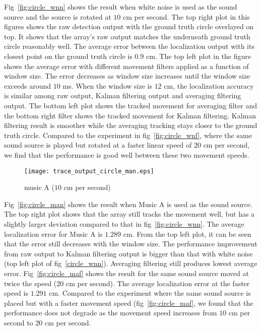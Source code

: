 Fig~\ref{fig:circle_wnn} shows the result when white noise is used as the sound source and the source is rotated at $10$ cm per second. The top right plot in this figures shows the raw detection output with the ground truth circle overlayed on top. It shows that the array's raw output matches the underneath ground truth circle reasonably well. The average error between the localization output with its closest point on the ground truth circle is $0.9$ cm. The top left plot in the figure shows the average error with different movement filters applied as a function of window size. The error decreases as window size increases until the window size exceeds around $10$ ms. When the window size is $12$ cm, the localization accuracy is similar among raw output, Kalman filtering output and averaging filtering output. The bottom left plot shows the tracked movement for averaging filter and the bottom right filter shows the tracked movement for Kalman filtering. Kalman filtering result is smoother while the averaging tracking stays closer to the ground truth circle. Compared to the experiment in fig~\ref{fig:circle_wnf}, where the same sound source is played but rotated at a faster linear speed of $20$ cm per second, we find that the performance is good well between these two movement speeds.

\begin{figure*}[h!]
\centering
\texttt{[image: trace\_output\_circle\_man.eps]}
\caption{music A ($10$ cm per second)}
\label{fig:circle_musican}
\end{figure*}

Fig~\ref{fig:circle_man} shows the result when Music A is used as the sound source.  The top right plot shows that the array still tracks the movement well, but has a slightly larger deviation compared to that in fig~\ref{fig:circle_wnn}. The average localization error for Music A is $1.289$ cm. From the top left plot, it can be seen that the error still decreases with the window size. The performance improvement from raw output to Kalman filtering output is bigger than that with white noise (top left plot of fig~\ref{circle_wnn}). Averaging filtering still produces lowest average error. Fig~\ref{fig:circle_maf} shows the result for the same sound source moved at twice the speed ($20$ cm per second). The average localization error at the faster speed is $1.291$ cm. Compared to the experiment where the same sound source is placed but with a faster movement speed (fig~\ref{fig:circle_maf}, we found that the performance does not degrade as the movement speed increases from $10$ cm per second to $20$ cm per second. 

